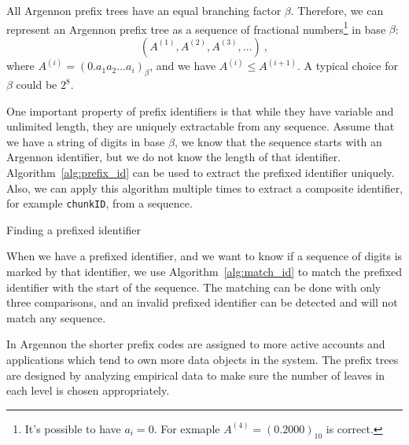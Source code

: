All Argennon prefix trees have an equal branching factor \(\beta\). Therefore, we can represent an Argennon
prefix tree as a sequence of fractional numbers\footnote{It's possible to have \(a_i=0\). For
exmaple \(A^{(4)}=(0.2000)_{10}\) is correct.} in base \(\beta\):
\[
    (A^{(1)},A^{(2)},A^{(3)},\dots)\ ,
\]
where \(A^{(i)}=(0.a_{1}a_{2}\dots a_{i})_\beta\), and we have \(A^{(i)} \leq A^{(i+1)}\). A typical choice for
\(\beta\) could be \(2^8\).

One important property of prefix identifiers is that while they have variable and unlimited length, they are
uniquely extractable from any sequence. Assume that we have a string of digits in base $\beta$, we
know that the sequence starts with an Argennon identifier, but we do not know the length of that identifier.
Algorithm~\ref{alg:prefix_id} can be used to extract the prefixed identifier uniquely. Also, we can apply this algorithm
multiple times to extract a composite identifier, for example \texttt{chunkID}, from a sequence.

\begin{algorithm}[t]
    \DontPrintSemicolon
    \BlankLine
    \BlankLine
    {
        {
            \;
        }
    }
    \;
    \caption{Finding a prefixed identifier}\label{alg:prefix_id}
\end{algorithm}

When we have a prefixed identifier, and we want to know if a sequence of digits is marked by that identifier,
we use Algorithm~\ref{alg:match_id} to match the prefixed identifier with the start of the sequence. The matching
can be done with only three comparisons, and an invalid prefixed identifier can be detected and will not match
any sequence.

In Argennon the shorter prefix codes are assigned to more active accounts and applications which tend to own more
data objects in the system. The prefix trees are designed by analyzing empirical data to make sure the number
of leaves in each level is chosen appropriately.

